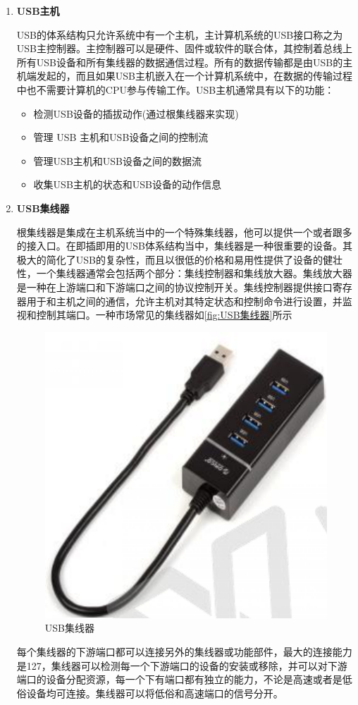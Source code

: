 \begin{enumerate}
\item \textbf{USB主机}

	USB的体系结构只允许系统中有一个主机，主计算机系统的USB接口称之为USB主控制器。主控制器可以是硬件、固件或软件的联合体，其控制着总线上所有USB设备和所有集线器的数据通信过程。所有的数据传输都是由USB的主机端发起的，而且如果USB主机嵌入在一个计算机系统中，在数据的传输过程中也不需要计算机的CPU参与传输工作。USB主机通常具有以下的功能：
	\begin{itemize}
	\item 检测USB设备的插拔动作(通过根集线器来实现)
	\item 管理 USB 主机和USB设备之间的控制流
	\item 管理USB主机和USB设备之间的数据流
	\item 收集USB主机的状态和USB设备的动作信息
	\end{itemize}
\item \textbf{USB集线器}
	
	根集线器是集成在主机系统当中的一个特殊集线器，他可以提供一个或者跟多的接入口。在即插即用的USB体系结构当中，集线器是一种很重要的设备。其极大的简化了USB的复杂性，而且以很低的价格和易用性提供了设备的健壮性，一个集线器通常会包括两个部分：集线控制器和集线放大器。集线放大器是一种在上游端口和下游端口之间的协议控制开关。集线控制器提供接口寄存器用于和主机之间的通信，允许主机对其特定状态和控制命令进行设置，并监视和控制其端口。一种市场常见的集线器如\autoref{fig:USB集线器}所示
\begin{figure}[!ht]
\centering
\includegraphics[width=.5\textwidth]{./graphics/usb-hub.pdf}
\caption{USB集线器}\label{fig:USB集线器}
\end{figure}

每个集线器的下游端口都可以连接另外的集线器或功能部件，最大的连接能力是127，集线器可以检测每一个下游端口的设备的安装或移除，并可以对下游端口的设备分配资源，每一个下有端口都有独立的能力，不论是高速或者是低俗设备均可连接。集线器可以将低俗和高速端口的信号分开。


\end{enumerate}
